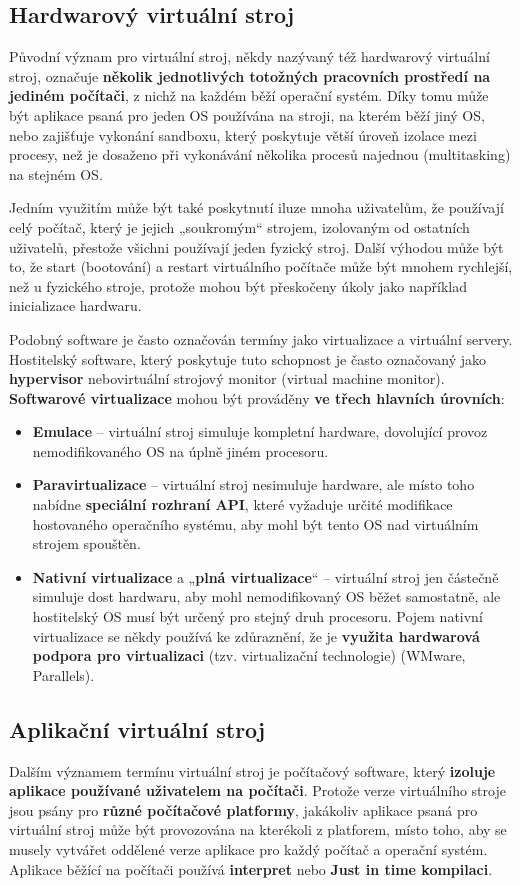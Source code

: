 \subsection{Hardwarový virtuální stroj}
Původní význam pro virtuální stroj, někdy nazývaný též hardwarový virtuální stroj, označuje \textbf{několik jednotlivých totožných pracovních prostředí na jediném počítači}, z nichž na každém běží operační systém. Díky tomu může být aplikace psaná pro jeden OS používána na stroji, na kterém běží jiný OS, nebo zajišťuje vykonání sandboxu, který poskytuje větší úroveň izolace mezi procesy, než je dosaženo při vykonávání několika procesů najednou (multitasking) na stejném OS.

Jedním využitím může být také poskytnutí iluze mnoha uživatelům, že používají celý počítač, který je jejich „soukromým“ strojem, izolovaným od ostatních uživatelů, přestože všichni používají jeden fyzický stroj. Další výhodou může být to, že start (bootování) a restart virtuálního počítače může být mnohem rychlejší, než u fyzického stroje, protože mohou být přeskočeny úkoly jako například inicializace hardwaru.

Podobný software je často označován termíny jako virtualizace a virtuální servery. Hostitelský software, který poskytuje tuto schopnost je často označovaný jako \textbf{hypervisor} nebovirtuální strojový monitor (virtual machine monitor).
\textbf{Softwarové virtualizace} mohou být prováděny \textbf{ve třech hlavních úrovních}:
\begin{itemize}
    \item \textbf{Emulace} -- virtuální stroj simuluje kompletní hardware, dovolující provoz nemodifikovaného OS na úplně jiném procesoru.
    \item\textbf{Paravirtualizace} -- virtuální stroj nesimuluje hardware, ale místo toho nabídne \textbf{speciální rozhraní API}, které vyžaduje určité modifikace hostovaného operačního systému, aby mohl být tento OS nad virtuálním strojem spouštěn.
    \item\textbf{Nativní virtualizace} a „\textbf{plná virtualizace}“ -- virtuální stroj jen částečně simuluje dost hardwaru, aby mohl nemodifikovaný OS běžet samostatně, ale hostitelský OS musí být určený pro stejný druh procesoru. Pojem nativní virtualizace se někdy používá ke zdůraznění, že je \textbf{využita hardwarová podpora pro virtualizaci} (tzv. virtualizační technologie) (WMware, Parallels).
\end{itemize}

\subsection{Aplikační virtuální stroj}
Dalším významem termínu virtuální stroj je počítačový software, který\textbf{ izoluje aplikace používané uživatelem na počítači}. Protože verze virtuálního stroje jsou psány pro \textbf{různé počítačové platformy}, jakákoliv aplikace psaná pro virtuální stroj může být provozována na kterékoli z platforem, místo toho, aby se musely vytvářet oddělené verze aplikace pro každý počítač a operační systém. Aplikace běžící na počítači používá \textbf{interpret} nebo \textbf{Just in time kompilaci}.

